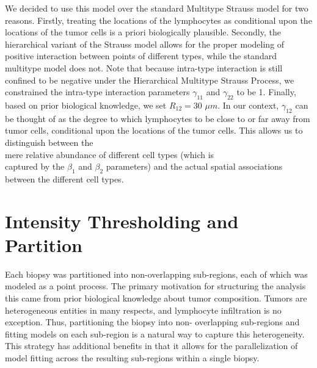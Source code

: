\documentclass[
]{book}
\begin{document}
We decided to use this model over the standard Multitype Strauss
model for two reasons.
Firstly, treating the locations of the lymphocytes as conditional
upon the locations of the tumor cells is a priori biologically
plausible. Secondly, the hierarchical variant of the Strauss
model allows for the proper modeling of positive interaction
between points of different types, while the standard
multitype model does not. Note that because intra-type
interaction is still confined to be negative under the
Hierarchical Multitype Strauss Process, we constrained the
intra-type interaction parameters \(\gamma_{11}\) and \(\gamma_{22}\)
to be 1. Finally, based on prior biological knowledge, we set
\(R_{12} = 30\) \(\mu m\). In our context, \(\gamma_{12}\) can be
thought of as the degree to which lymphocytes to be close to or
far away from tumor cells, conditional upon the locations
of the tumor cells. This allows us to distinguish between the\\
mere relative abundance of different cell types (which is\\
captured by the \(\beta_1\) and \(\beta_2\) parameters) and the
actual spatial associations between the different cell types.

\hypertarget{intensity-thresholding-and-partition}{%
\section{Intensity Thresholding and Partition}\label{intensity-thresholding-and-partition}}

Each biopsy was partitioned into non-overlapping sub-regions,
each of which was modeled as a point process. The primary
motivation for structuring the analysis this came from prior
biological knowledge about tumor composition. Tumors are
heterogeneous entities in many respects, and lymphocyte infiltration
is no exception. Thus, partitioning the biopsy into non-
overlapping sub-regions and fitting models on each sub-region is
a natural way to capture this heterogeneity. This strategy has additional benefits in that it allows for the parallelization of
model fitting across the resulting sub-regions within a single
biopsy.
\end{document}
